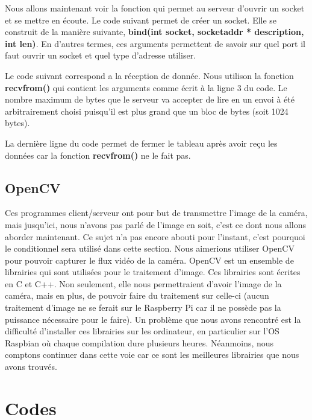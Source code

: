 \documentclass[a4paper,11pt]{report}
\begin{document}
{\begin{enumerate}
\begin{enumerate}
Nous allons maintenant voir la fonction qui permet au serveur d'ouvrir un socket et se mettre en écoute. Le code suivant permet de créer un socket. Elle se construit de la manière suivante, \textbf{bind(int socket, socketaddr * description, int len)}. En d'autres termes, ces arguments permettent de savoir sur quel port il faut ouvrir un socket et quel type d'adresse utiliser. 



Le code suivant correspond a la réception de donnée. Nous utilison la fonction \textbf{recvfrom()} qui contient les arguments comme écrit à la ligne 3 du code. Le nombre maximum de bytes que le serveur va accepter de lire en un envoi à été arbitrairement choisi puisqu'il est plus grand que un bloc de bytes (soit 1024 bytes). 


La dernière ligne du code permet de fermer le tableau après avoir reçu les données car la fonction \textbf{recvfrom()} ne le fait pas.




\subsection{OpenCV}
Ces programmes client/serveur ont pour but de transmettre l'image de la caméra, mais jusqu'ici, nous n'avons pas parlé de l'image en soit, c'est ce dont nous allons aborder maintenant. Ce sujet n'a pas encore abouti pour l'instant, c'est pourquoi le conditionnel sera utilisé dans cette section. Nous aimerions utiliser OpenCV pour pouvoir capturer le flux vidéo de la caméra. OpenCV est un ensemble de librairies qui sont utilisées pour le traitement d'image. Ces librairies sont écrites en C et C++. Non seulement, elle nous permettraient d'avoir l'image de la caméra, mais en plus, de pouvoir faire du traitement sur celle-ci (aucun traitement d'image ne se ferait sur le Raspberry Pi car il ne possède pas la puissance nécessaire  pour le faire). Un problème que nous avons rencontré est la difficulté d'installer ces librairies sur les ordinateur, en particulier sur l'OS Raspbian où chaque compilation dure plusieurs heures. Néanmoins, nous comptons continuer dans cette voie car ce sont les meilleures librairies que nous avons trouvés.

\section{Codes}


\end{enumerate}
\end{enumerate}}
\end{document}
